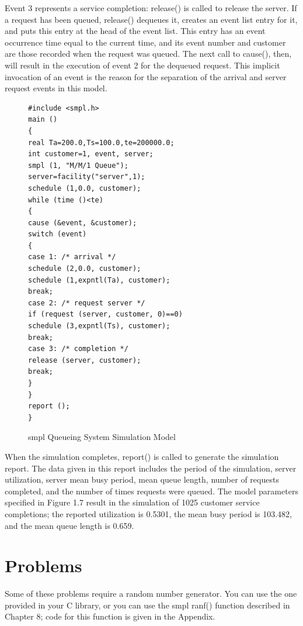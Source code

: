 Event 3 represents a service completion: release() is called to release the
server. If a request has been queued, release() dequeues it, creates an event
list entry for it, and puts this entry at the head of the event list. This
entry has an event occurrence time equal to the current time, and its event
number and customer are those recorded when the request was queued. The next
call to cause(), then, will result in the execution of event 2 for the dequeued
request. This implicit invocation of an event is the reason for the separation
of the arrival and server request events in this model.

\begin{figure}[htbp]
  \centering
  \begin{minipage}{0.9\textwidth}
    \begin{verbatim}
#include <smpl.h>
main ()
{
real Ta=200.0,Ts=100.0,te=200000.0;
int customer=1, event, server;
smpl (1, "M/M/1 Queue");
server=facility("server",1);
schedule (1,0.0, customer);
while (time ()<te)
{
cause (&event, &customer);
switch (event)
{
case 1: /* arrival */
schedule (2,0.0, customer);
schedule (1,expntl(Ta), customer);
break;
case 2: /* request server */
if (request (server, customer, 0)==0)
schedule (3,expntl(Ts), customer);
break;
case 3: /* completion */
release (server, customer);
break;
}
}
report ();
}
    \end{verbatim}
  \end{minipage}
  \caption{smpl Queueing System Simulation Model}
\end{figure}

When the simulation completes, report() is called to generate the simulation
report. The data given in this report includes the period of the simulation,
server utilization, server mean busy period, mean queue length, number of
requests completed, and the number of times requests were queued. The model
parameters specified in Figure 1.7 result in the simulation of 1025 customer
service completions; the reported utilization is 0.5301, the mean busy period
is 103.482, and the mean queue length is 0.659.

\section{Problems}
\label{sec:intro-problems}

Some of these problems require a random number generator. You can use the one
provided in your C library, or you can use the smpl ranf() function described
in Chapter 8; code for this function is given in the Appendix.

